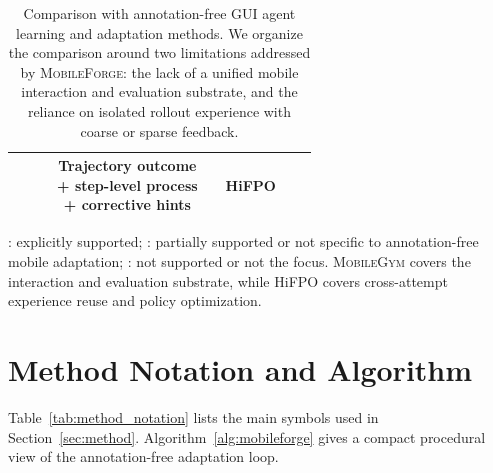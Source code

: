 \documentclass{llmxive}
\providecommand{\cmark}{\ding{51}}
\providecommand{\xmark}{\ding{55}}
\providecommand{\pmark}{\raisebox{0.1ex}{\scriptsize$\triangle$}}
\providecommand{\ourmethod}{\textsc{MobileForge}\xspace}
\providecommand{\mobilegym}{\textsc{MobileGym}\xspace}
\providecommand{\hifpo}{HiFPO\xspace}
\begin{document}
\begin{table}[t]
\begin{paperFit}[\textwidth]
\begin{tabular}{l l c c c l c l}
\cmark &
\cmark &
\cmark &
\makecell[l]{\textbf{Trajectory outcome}\\\textbf{+ step-level process}\\\textbf{+ corrective hints}} &
\cmark &
\textbf{\hifpo} \\
\bottomrule
\end{tabular}
\end{paperFit}
\vspace{2pt}
\begin{flushleft}
\footnotesize
\cmark: explicitly supported; \pmark: partially supported or not specific to annotation-free mobile adaptation; \xmark: not supported or not the focus. \mobilegym covers the interaction and evaluation substrate, while \hifpo covers cross-attempt experience reuse and policy optimization.
\end{flushleft}
\caption{Comparison with annotation-free GUI agent learning and adaptation methods. We organize the comparison around two limitations addressed by \ourmethod: the lack of a unified mobile interaction and evaluation substrate, and the reliance on isolated rollout experience with coarse or sparse feedback.}
\label{tab:related_work_comparison}
\end{table}


\section{Method Notation and Algorithm}
\label{sec:appendix_method_details}

Table~\ref{tab:method_notation} lists the main symbols used in Section~\ref{sec:method}. Algorithm~\ref{alg:mobileforge} gives a compact procedural view of the annotation-free adaptation loop.
\end{document}
